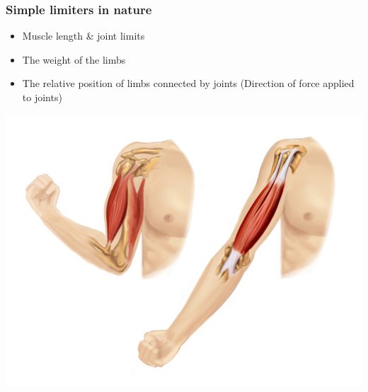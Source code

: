\documentclass{beamer}
\begin{document}
\begin{frame}
	\frametitle{Simple limiters in nature}
	
	\begin{minipage}{.5\textwidth}
	\begin{itemize}
	\item Muscle length \& joint limits
	\item The weight of the limbs
	\item The relative position of limbs connected by joints (Direction of force applied to joints)
	\end{itemize}
\end{minipage}%
\begin{minipage}{.5\textwidth}
	\includegraphics[width=1\textwidth]{figs/natural-limiter-arm-muscle.jpg}
\end{minipage}

\end{frame}
\end{document}

